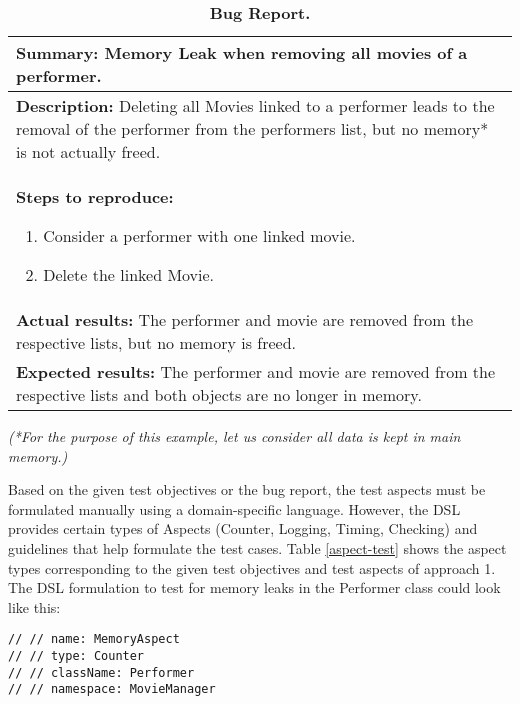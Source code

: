 \begin{table}[h]
\caption{\textbf{Bug Report.}}
\begin{tabular}{|p{14cm}|}
\hline
\textbf{Summary:} Memory Leak when removing all movies of a performer.\\
\hline
\textbf{Description:} Deleting all Movies linked to a performer leads to the removal of the performer from the performers list, but no memory* is not actually freed.\\
\hline
\textbf{Steps to reproduce:} \begin{enumerate} \item Consider a performer with one linked movie. \item Delete the linked Movie. \end{enumerate}\\
\hline
\textbf{Actual results:} The performer and movie are removed from the respective lists, but no memory is freed.\\
\hline
\textbf{Expected results:} The performer and movie are removed from the respective lists and both objects are no longer in memory.\\ 
\hline
\end{tabular}
\textit{(*For the purpose of this example, let us consider all data is kept in main memory.)}
\label{bug}
\end{table}


Based on the given test objectives or the bug report, the test aspects must be formulated manually using a domain-specific language. However, the DSL provides certain types of Aspects (Counter, Logging, Timing, Checking) and guidelines that help formulate the test cases. Table \ref{aspect-test} shows the aspect types corresponding to the given test objectives and test aspects of approach 1. The DSL formulation to test for memory leaks in the  Performer class  could look like this:

\lstset {language=C++}
\begin{lstlisting}[caption={\textbf{DSL Statement For Counter Aspect}}, label=dsl]
// // name: MemoryAspect              
// // type: Counter                           
// // className: Performer    
// // namespace: MovieManager       
\end{lstlisting}

